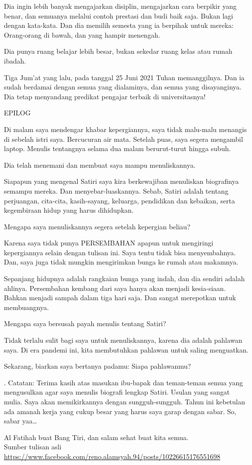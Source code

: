 Dia ingin lebih banyak mengajarkan disiplin, mengajarkan cara berpikir yang benar, dan semuanya melalui contoh prestasi dan budi baik saja. Bukan lagi dengan kata-kata. Dan dia memilih semesta yang ia berpihak untuk mereka: Orang-orang di bawah, dan yang hampir menengah.

Dia punya ruang belajar lebih besar, bukan sekedar ruang kelas atau rumah ibadah.

Tiga Jum’at yang lalu, pada tanggal 25 Juni 2021 Tuhan memanggilnya. Dan ia sudah berdamai dengan semua yang dialaminya, dan semua yang disayanginya. Dia tetap menyandang predikat pengajar terbaik di universitasnya!

EPILOG

Di malam saya mendengar khabar kepergiannya, saya tidak malu-malu menangis di sebelah istri saya. Bercucuran air mata. Setelah puas, saya segera mengambil laptop. Menulis tentangnya selama dua malam berurut-turut hingga subuh.

Dia telah menemani dan membuat saya mampu menuliskannya.

Siapapun yang mengenal Satiri saya kira berkewajiban menuliskan biografinya semampu mereka. Dan menyebar-luaskannya. Sebab, Satiri adalah tentang perjuangan, cita-cita, kasih-sayang, keluarga, pendidikan dan kebaikan, serta kegembiraan hidup yang harus dihidupkan.

Mengapa saya menuliskannya segera setelah kepergian beliau?

Karena saya tidak punya PERSEMBAHAN apapun untuk mengiringi kepergiannya selain dengan tulisan ini. Saya tentu tidak bisa menyembahnya. Dan, saya juga tidak mungkin mengirimkan bunga ke rumah atau makamnya.

Sepanjang hidupnya adalah rangkaian bunga yang indah, dan dia sendiri adalah ahlinya. Persembahan kembang dari saya hanya akan menjadi kesia-siaan. Bahkan menjadi sampah dalam tiga hari saja. Dan sangat merepotkan untuk membuangnya.

Mengapa saya bersusah payah menulis tentang Satiri?

Tidak terlalu sulit bagi saya untuk menuliskannya, karena dia adalah pahlawan saya. Di era pandemi ini, kita membutuhkan pahlawan untuk saling menguatkan.

Sekarang, biarkan saya bertanya padamu: Siapa pahlawanmu?

.
Catatan:
Terima kasih atas masukan ibu-bapak dan teman-teman semua yang mengusulkan agar saya menulis biografi lengkap Satiri. Usulan yang sangat mulia. Saya akan memikirkannya dengan sungguh-sungguh. Tahun ini kebetulan ada amanah kerja yang cukup besar yang harus saya garap dengan sabar. So, sabar yaa…

Al Fatihah buat Bang Tiri, dan salam sehat buat kita semua.
\\[10pt]

Sumber tulisan asli \url{https://www.facebook.com/reno.alamsyah.94/posts/10226615176551698}


